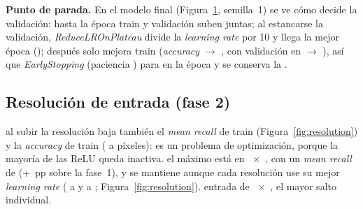 \textbf{Punto de parada.} En el modelo final (Figura~\ref{fig:stopping}, semilla~1) se ve cómo decide la validación: hasta la época
 train y validación suben juntas; al estancarse la validación, \emph{ReduceLROnPlateau}
divide la \emph{learning rate} por 10 y llega la mejor época (); después solo mejora train
(\emph{accuracy}  $\rightarrow$ , con validación en
 $\rightarrow$ ), así que \emph{EarlyStopping} (paciencia
) para en la época  y se conserva la .

\begin{figure}[!htbp]
  \centering
  \begin{minipage}[t]{0.485\linewidth}
    \centering
    \caption{}
    \label{fig:normalisation}
  \end{minipage}\hfill
  \begin{minipage}[t]{0.485\linewidth}
    \centering
    \caption{}
    \label{fig:stopping}
  \end{minipage}
\end{figure}

\subsection{Resolución de entrada (fase 2)}
{al subir la resolución baja también el \emph{mean recall} de train (Figura~\ref{fig:resolution}) y la \emph{accuracy}
de train ( a  píxeles):
es un problema de optimización, porque la mayoría de las ReLU queda inactiva.}
{el máximo está en ~$\times$~, con un \emph{mean recall} de 
(+~pp sobre la fase~1), y se mantiene aunque cada resolución use su mejor \emph{learning rate}
( a  y  a ;
Figura~\ref{fig:resolution}).}
{entrada de ~$\times$~, el mayor salto individual.}

